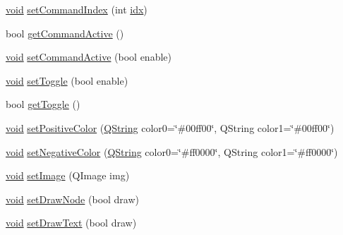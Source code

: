 \begin{DoxyCompactItemize}
\item 
\hyperlink{group___u_a_v_objects_plugin_ga444cf2ff3f0ecbe028adce838d373f5c}{void} \hyperlink{group___u_a_v_object_widget_utils_ga85c1946a33e5309ac2b9aa3675671935}{set\-Command\-Index} (int \hyperlink{uavobjecttemplate_8m_a49654e4709f40aecccada266daa32fc6}{idx})
\item 
bool \hyperlink{group___u_a_v_object_widget_utils_ga63b0822569ce8326323c15159682c57e}{get\-Command\-Active} ()
\item 
\hyperlink{group___u_a_v_objects_plugin_ga444cf2ff3f0ecbe028adce838d373f5c}{void} \hyperlink{group___u_a_v_object_widget_utils_ga224ddcb050b9008c2352ca9c1318159d}{set\-Command\-Active} (bool enable)
\item 
\hyperlink{group___u_a_v_objects_plugin_ga444cf2ff3f0ecbe028adce838d373f5c}{void} \hyperlink{group___u_a_v_object_widget_utils_ga55f38aaacbac71e094d96baf3df429a4}{set\-Toggle} (bool enable)
\item 
bool \hyperlink{group___u_a_v_object_widget_utils_gab63ea3448c47f2e65a056ec49b30e0d1}{get\-Toggle} ()
\item 
\hyperlink{group___u_a_v_objects_plugin_ga444cf2ff3f0ecbe028adce838d373f5c}{void} \hyperlink{group___u_a_v_object_widget_utils_ga1318ec003e5b6d72bb03b061f6df3996}{set\-Positive\-Color} (\hyperlink{group___u_a_v_objects_plugin_gab9d252f49c333c94a72f97ce3105a32d}{\-Q\-String} color0=\char`\"{}\#00ff00\char`\"{}, Q\-String color1=\char`\"{}\#00ff00\char`\"{})
\item 
\hyperlink{group___u_a_v_objects_plugin_ga444cf2ff3f0ecbe028adce838d373f5c}{void} \hyperlink{group___u_a_v_object_widget_utils_gaa22c8cab4fa7424caf1a9168f12365e3}{set\-Negative\-Color} (\hyperlink{group___u_a_v_objects_plugin_gab9d252f49c333c94a72f97ce3105a32d}{\-Q\-String} color0=\char`\"{}\#ff0000\char`\"{}, \-Q\-String color1=\char`\"{}\#ff0000\char`\"{})
\item 
\hyperlink{group___u_a_v_objects_plugin_ga444cf2ff3f0ecbe028adce838d373f5c}{void} \hyperlink{group___u_a_v_object_widget_utils_ga85ed2c5bf8ae66f16496bd5fef25362b}{set\-Image} (\-Q\-Image img)
\item 
\hyperlink{group___u_a_v_objects_plugin_ga444cf2ff3f0ecbe028adce838d373f5c}{void} \hyperlink{group___u_a_v_object_widget_utils_ga90b5c3c03fb1cca75ba471125d93b550}{set\-Draw\-Node} (bool draw)
\item 
\hyperlink{group___u_a_v_objects_plugin_ga444cf2ff3f0ecbe028adce838d373f5c}{void} \hyperlink{group___u_a_v_object_widget_utils_gac7a63c8df4268991b6c48f6d528fe02c}{set\-Draw\-Text} (bool draw)

\end{DoxyCompactItemize}
